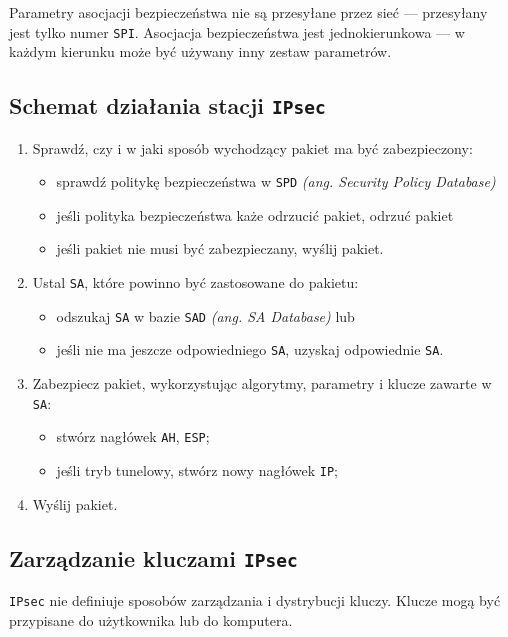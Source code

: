 \documentclass[a4paper]{article}
\begin{document}
Parametry asocjacji bezpieczeństwa nie są przesyłane przez sieć --- przesyłany jest tylko numer {\tt SPI}.
Asocjacja bezpieczeństwa jest jednokierunkowa --- w każdym kierunku może być używany inny zestaw parametrów.

\subsection{Schemat działania stacji {\tt IPsec}}

\begin{enumerate}
  \item Sprawdź, czy i w jaki sposób wychodzący pakiet ma być zabezpieczony:
  \begin{itemize}
    \item sprawdź politykę bezpieczeństwa w {\tt SPD} \emph{(ang. Security Policy Database)}
    \item jeśli polityka bezpieczeństwa każe odrzucić pakiet, odrzuć pakiet
    \item jeśli pakiet nie musi być zabezpieczany, wyślij pakiet.
  \end{itemize}
  \item Ustal {\tt SA}, które powinno być zastosowane do pakietu:
  \begin{itemize}
    \item odszukaj {\tt SA} w bazie {\tt SAD} \emph{(ang. SA Database)} lub
    \item jeśli nie ma jeszcze odpowiedniego {\tt SA}, uzyskaj odpowiednie {\tt SA}.
  \end{itemize}
  \item Zabezpiecz pakiet, wykorzystując algorytmy, parametry i klucze zawarte w {\tt SA}:
  \begin{itemize}
    \item stwórz nagłówek {\tt AH}, {\tt ESP};
    \item jeśli tryb tunelowy, stwórz nowy nagłówek {\tt IP};
  \end{itemize}
  \item Wyślij pakiet.
\end{enumerate}

\subsection{Zarządzanie kluczami {\tt IPsec}}

{\tt IPsec} nie definiuje sposobów zarządzania i dystrybucji kluczy.
Klucze mogą być przypisane do użytkownika lub do komputera.
\end{document}
